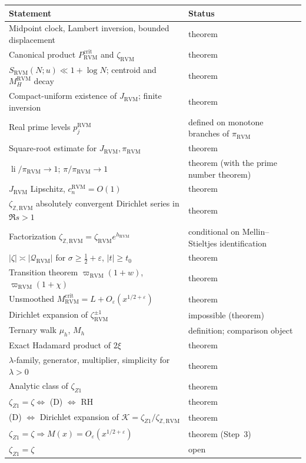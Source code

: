 \documentclass[11pt,reqno]{amsart}
\numberwithin{equation}{section}
\theoremstyle{plain}
\theoremstyle{definition}
\theoremstyle{remark}
\newcommand{\Z}{\mathbb Z}
\newcommand{\eps}{\varepsilon}
\newcommand{\li}{\operatorname{li}}
\newcommand{\RVM}{\mathrm{RVM}}
\newcommand{\crit}{\mathrm{crit}}
\begin{document}
\begin{center}
\small
\begin{tabular}{p{}p{}}
\toprule
Statement & Status\\
\midrule
Midpoint clock, Lambert inversion, bounded displacement & theorem\\
Canonical product $P_{\RVM}^{\crit}$ and $\zeta_{\RVM}$ & theorem\\
$S_{\RVM}(N;u)\ll1+\log N$; centroid and $M_H^{\RVM}$ decay & theorem\\
Compact-uniform existence of $J_{\RVM}$; finite inversion & theorem\\
Real prime levels $p_j^{\RVM}$ & defined on monotone branches of $\pi_{\RVM}$\\
Square-root estimate for $J_{\RVM},\pi_{\RVM}$ & theorem\\
$\li/\pi_{\RVM}\to1$; $\pi/\pi_{\RVM}\to1$ & theorem (with the prime number theorem)\\
$J_{\RVM}$ Lipschitz, $c_n^{\RVM}=O(1)$ & theorem\\
$\zeta_{\Z,\RVM}$ absolutely convergent Dirichlet series in $\Re s>1$ & theorem\\
Factorization $\zeta_{\Z,\RVM}=\zeta_{\RVM}e^{h_{\RVM}}$ & conditional on Mellin--Stieltjes identification\\
$|\zeta|\asymp|\mathcal Q_{\RVM}|$ for $\sigma\ge\frac12+\eps$, $|t|\ge t_0$ & theorem\\
Transition theorem $\varpi_{\RVM}(1+w)$, $\varpi_{\RVM}(1+\chi)$ & theorem\\
Unsmoothed $M_{\RVM}^{\crit}=L+O_\eps(x^{1/2+\eps})$ & theorem\\
Dirichlet expansion of $\zeta_{\RVM}^{\pm1}$ & impossible (theorem)\\
Ternary walk $\mu_h$, $M_h$ & definition; comparison object\\
Exact Hadamard product of $2\xi$ & theorem\\
$\lambda$-family, generator, multiplier, simplicity for $\lambda>0$ & theorem\\
Analytic class of $\zeta_{Z1}$ & theorem\\
$\zeta_{Z1}=\zeta\Leftrightarrow$ (D) $\Leftrightarrow$ RH & theorem\\
(D) $\Leftrightarrow$ Dirichlet expansion of $\mathcal K=\zeta_{Z1}/\zeta_{\Z,\RVM}$ & theorem\\
$\zeta_{Z1}=\zeta\Rightarrow M(x)=O_\eps(x^{1/2+\eps})$ & theorem (Step~3)\\
$\zeta_{Z1}=\zeta$ & open\\
\bottomrule
\end{tabular}
\end{center}
\end{document}
